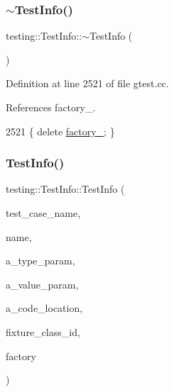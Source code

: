 \subsubsection{\texorpdfstring{$\sim$\+Test\+Info()}{~TestInfo()}}
{\footnotesize\ttfamily testing\+::\+Test\+Info\+::$\sim$\+Test\+Info (\begin{DoxyParamCaption}{ }\end{DoxyParamCaption})}



Definition at line 2521 of file gtest.\+cc.



References factory\+\_\+.


\begin{DoxyCode}
2521 \{ \textcolor{keyword}{delete} \hyperlink{classtesting_1_1TestInfo_a6bf2422602b877c73f6eb169a63cfea8}{factory\_}; \}
\end{DoxyCode}
\mbox{\label{classtesting_1_1TestInfo_afc4a66e2d2491f09e8549c71514c3d78}} 
\subsubsection{\texorpdfstring{Test\+Info()}{TestInfo()}}
{\footnotesize\ttfamily testing\+::\+Test\+Info\+::\+Test\+Info (\begin{DoxyParamCaption}\item[{const std\+::string \&}]{test\+\_\+case\+\_\+name,  }\item[{const std\+::string \&}]{name,  }\item[{const char $\ast$}]{a\+\_\+type\+\_\+param,  }\item[{const char $\ast$}]{a\+\_\+value\+\_\+param,  }\item[{\hyperlink{structtesting_1_1internal_1_1CodeLocation}{internal\+::\+Code\+Location}}]{a\+\_\+code\+\_\+location,  }\item[{\hyperlink{namespacetesting_1_1internal_ab1114197d3c657d8b7f8e0c5caa12d00}{internal\+::\+Type\+Id}}]{fixture\+\_\+class\+\_\+id,  }\item[{\hyperlink{classtesting_1_1internal_1_1TestFactoryBase}{internal\+::\+Test\+Factory\+Base} $\ast$}]{factory }\end{DoxyParamCaption})\hspace{0.3cm}{\ttfamily [private]}}




